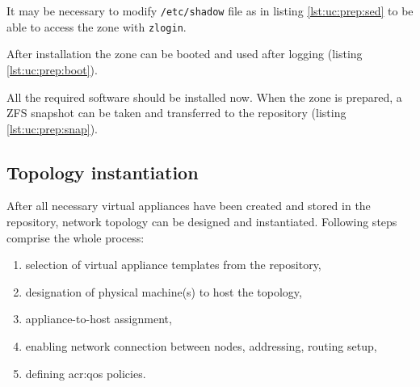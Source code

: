 \documentclass[11pt,openany]{book}
\begin{document}
        \noindent
        \begin{minipage}{\textwidth}
          
        \end{minipage}

        \noindent
        It may be necessary to modify \texttt{/etc/shadow} file as in listing \ref{lst:uc:prep:sed} to be able to access
        the zone with \texttt{zlogin}. \\

        \noindent
        \begin{minipage}{\textwidth}
          
        \end{minipage}

        \noindent
        After installation the zone can be booted and used after logging (listing \ref{lst:uc:prep:boot}). \\

        \noindent
        \begin{minipage}{\textwidth}
          
        \end{minipage}

        \noindent
        All the required software should be installed now. When the zone is prepared, a ZFS snapshot can be taken and
        transferred to the repository (listing \ref{lst:uc:prep:snap}). \\

        \noindent
        \begin{minipage}{\textwidth}
          
        \end{minipage}


      \subsection{Topology instantiation}
      \label{ssub:}

        After all necessary virtual appliances have been created and stored in the repository, network topology can be
        designed and instantiated. Following steps comprise the whole process:

        \begin{enumerate}
          \item selection of virtual appliance templates from the repository,
          \item designation of physical machine(s) to host the topology,
          \item appliance-to-host assignment,
          \item enabling network connection between nodes, addressing, routing setup,
          \item defining \gls{acr:qos} policies.
        \end{enumerate}
\end{document}
